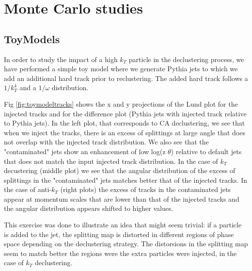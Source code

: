

\section{Monte Carlo studies}
\subsection{ToyModels}

In order to study the impact of a high $k_{T}$ particle in the declustering process, we have performed a simple toy model where we generate Pythia jets to which we add an additional hard track prior to reclustering. The added hard track follows a $1/k_{T}^{4}$ and a $1/\omega$ distribution. 

Fig \ref{fig:toymodeltracks} shows the x and y projections of the Lund plot for the injected tracks and for the difference plot (Pythia jets with injected track relative to Pythia jets). In the left plot, that corresponds to CA declustering, we see that when we inject the tracks, there is an excess of splittings at large angle that does not overlap with the injected track distribution. We also see that the "contaminated" jets show an enhancement of low log(z $\theta$) relative to default jets that does not match the input injected track distribution. 
In the case of $k_{T}$ decustering (middle plot) we see that the angular distribution of the excess of splittings in the "contaminated" jets matches better that of the injected tracks. 
In the case of anti-$k_{T}$ (right plots) the excess of tracks in the contaminated jets appear at momentum scales that are lower than that of the injected tracks and the angular distribution appears shifted to higher values. 

This exercise was done to illustrate an idea that might seem trivial: if a particle is added to the jet, the splitting map is distorted in different regions of phase space depending on the declustering strategy. The distorsions in the splitting map seem to match better the regions were the extra particles were injected, in the case of $k_{T}$ declustering. 

